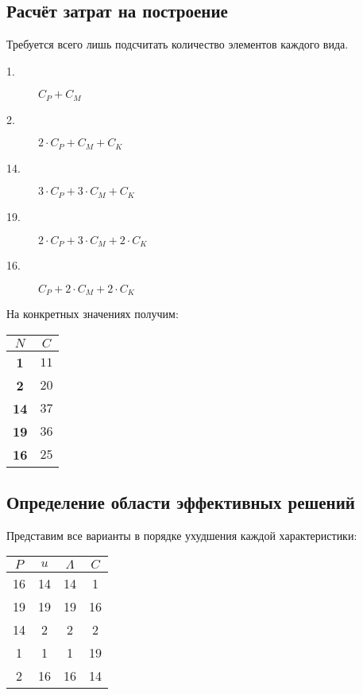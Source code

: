 \documentclass[12pt, a4paper] {ncc}
\begin{document}
\subsection{Расчёт затрат на построение}

Требуется всего лишь подсчитать количество элементов каждого вида.

\begin{description}
\item[1.]  $C_P + C_M$
\item[2.]  $2 \cdot C_P + C_M + C_K$
\item[14.] $3 \cdot C_P + 3 \cdot C_M + C_K$
\item[19.] $2 \cdot C_P + 3 \cdot C_M + 2 \cdot C_K$
\item[16.] $C_P + 2 \cdot C_M + 2 \cdot C_K$
\end{description}

На конкретных значениях получим:

\begin{tabular}{|c|c|}
\hline
$N$    & $C$ \\ \hline
\bf 1  & $11$ \\ \hline
\bf 2  & $20$ \\ \hline
\bf 14 & $37$ \\ \hline
\bf 19 & $36$ \\ \hline
\bf 16 & $25$ \\ \hline
\end{tabular}

\subsection{Определение области эффективных решений}

Представим все варианты в порядке ухудшения каждой характеристики:


\begin{tabular}{|c|c|c|c|}
\hline
$P$ & $u$ & $\Lambda$ & $C$ \\ \hline
\hline
16  & 14  & 14        &  1 \\ \hline
19  & 19  & 19        & 16 \\ \hline
14  &  2  &  2        &  2 \\ \hline
1   &  1  &  1        & 19 \\ \hline
2   & 16  & 16        & 14 \\ \hline
\end{tabular}
\end{document}

